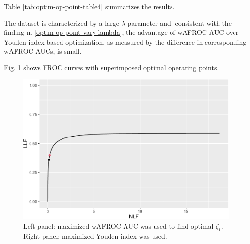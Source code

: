 \documentclass[
]{book}
\begin{document}
Table \ref{tab:optim-op-point-table4} summarizes the results.

\begin{table}[H]

\caption{\label{tab:optim-op-point-table4}Summary of optimization results for example FROC dataset. The wAFROC column always displays wAFROC-AUC, even though the optimized quantity may the Youden-index, as in the last four rows.}
\centering
{}
\end{table}

The dataset is characterized by a large \(\lambda\) parameter and, consistent with the finding in \ref{optim-op-point-vary-lambda}, the advantage of wAFROC-AUC over Youden-index based optimization, as measured by the difference in corresponding wAFROC-AUCs, is small.

Fig. \ref{fig:optim-op-point-application-froc} shows FROC curves with superimposed optimal operating points.

\begin{figure}
\centering
\includegraphics{21-optim-op-point_files/figure-latex/optim-op-point-application-froc-1.pdf}
\caption{\label{fig:optim-op-point-application-froc}Left panel: maximized wAFROC-AUC was used to find optimal \(\zeta_1\). Right panel: maximized Youden-index was used.}
\end{figure}
\end{document}
